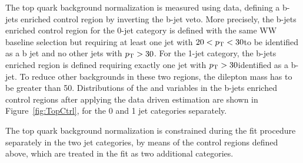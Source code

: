 The top quark background normalization is measured using data, defining a b-jets enriched control region by inverting the b-jet veto. More precisely, the b-jets enriched control region for the 0-jet category is defined with the same WW baseline selection but requiring at least one jet with $20<p_\mathrm{T}<30$\GeV to be identified as a b jet and no other jets with $p_\mathrm{T} > 30$\GeV. For the 1-jet category, the b-jets enriched region is defined requiring exactly one jet with $p_\mathrm{T}>30$\GeV identified as a b-jet.
To reduce other backgrounds in these two regions, the dilepton mass has to be greater than 50\GeV. Distributions of the \mll and \mt variables in the b-jets enriched control regions after applying the data driven estimation are shown in Figure~\ref{fig:TopCtrl}, for the 0 and 1 jet categories separately.

The top quark background normalization is constrained during the fit procedure separately in the two jet categories, by means of the control regions defined above, which are treated in the fit as two additional categories. 

